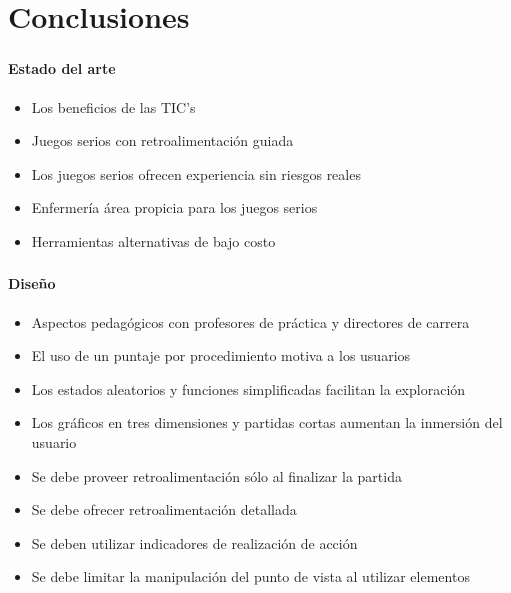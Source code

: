 \section{Conclusiones}
\setcounter{sectiontotal}{4}

\begin{frame}
\frametitle{\pagetitle}
\framesubtitle{Estado del arte}
\begin{itemize}[<+->]

\item Los beneficios de las TIC's

\item Juegos serios con retroalimentación guiada

\item Los juegos serios ofrecen experiencia sin riesgos reales

\item Enfermería área propicia para los juegos serios

\item Herramientas alternativas de bajo costo

\end{itemize}
\end{frame}
\begin{frame}
\frametitle{\pagetitle}
\framesubtitle{Diseño}
\begin{itemize}[<+->]


\item Aspectos pedagógicos con profesores de práctica y directores de
        carrera

\item El uso de un puntaje por procedimiento motiva a los usuarios

\item Los estados aleatorios y funciones simplificadas facilitan la exploración

\item Los gráficos en tres dimensiones y partidas cortas aumentan la inmersión del usuario

\item Se debe proveer retroalimentación sólo al finalizar la partida

\item Se debe ofrecer retroalimentación detallada

\item Se deben utilizar indicadores de realización de acción

\item Se debe limitar la manipulación del punto de vista al utilizar elementos

\end{itemize}
\end{frame}

